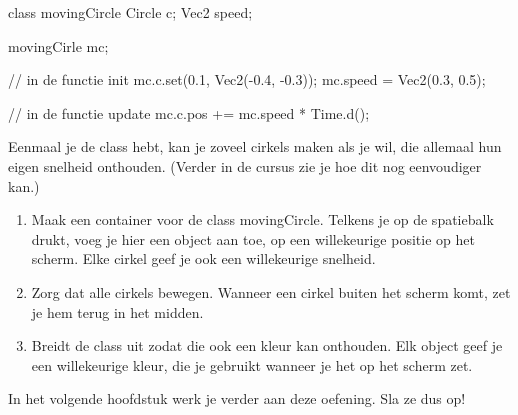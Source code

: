 \begin{code}
class movingCircle {
  Circle c;
  Vec2 speed;
}

movingCirle mc;

// in de functie init
mc.c.set(0.1, Vec2(-0.4, -0.3));
mc.speed = Vec2(0.3, 0.5);

// in de functie update
mc.c.pos += mc.speed * Time.d();
\end{code}

Eenmaal je de class  hebt, kan je zoveel cirkels maken als je wil, die allemaal hun eigen snelheid onthouden. (Verder in de cursus zie je hoe dit nog eenvoudiger kan.)


\begin{exercise}
\begin{enumerate}
  \item Maak een container voor de class movingCircle. Telkens je op de spatiebalk drukt, voeg je hier een object aan toe, op een willekeurige positie op het scherm. Elke cirkel geef je ook een willekeurige snelheid.
	\item Zorg dat alle cirkels bewegen. Wanneer een cirkel buiten het scherm komt, zet je hem terug in het midden.
	\item Breidt de class  uit zodat die ook een kleur kan onthouden. Elk object geef je een willekeurige kleur, die je gebruikt wanneer je het op het scherm zet.
	\end{enumerate}
\end{exercise}

\begin{note}
In het volgende hoofdstuk werk je verder aan deze oefening. Sla ze dus op!
\end{note}
